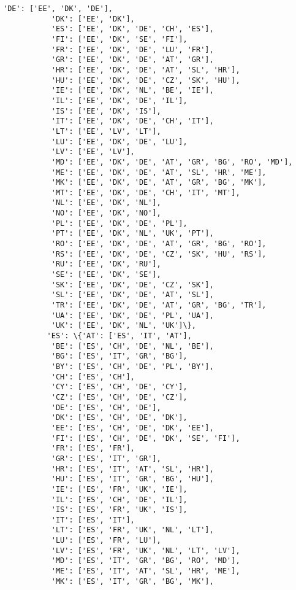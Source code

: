 \documentclass[11pt]{article}
\begin{document}
\begin{Verbatim}[commandchars=\\\{\}]
           'DE': ['EE', 'DK', 'DE'],
           'DK': ['EE', 'DK'],
           'ES': ['EE', 'DK', 'DE', 'CH', 'ES'],
           'FI': ['EE', 'DK', 'SE', 'FI'],
           'FR': ['EE', 'DK', 'DE', 'LU', 'FR'],
           'GR': ['EE', 'DK', 'DE', 'AT', 'GR'],
           'HR': ['EE', 'DK', 'DE', 'AT', 'SL', 'HR'],
           'HU': ['EE', 'DK', 'DE', 'CZ', 'SK', 'HU'],
           'IE': ['EE', 'DK', 'NL', 'BE', 'IE'],
           'IL': ['EE', 'DK', 'DE', 'IL'],
           'IS': ['EE', 'DK', 'IS'],
           'IT': ['EE', 'DK', 'DE', 'CH', 'IT'],
           'LT': ['EE', 'LV', 'LT'],
           'LU': ['EE', 'DK', 'DE', 'LU'],
           'LV': ['EE', 'LV'],
           'MD': ['EE', 'DK', 'DE', 'AT', 'GR', 'BG', 'RO', 'MD'],
           'ME': ['EE', 'DK', 'DE', 'AT', 'SL', 'HR', 'ME'],
           'MK': ['EE', 'DK', 'DE', 'AT', 'GR', 'BG', 'MK'],
           'MT': ['EE', 'DK', 'DE', 'CH', 'IT', 'MT'],
           'NL': ['EE', 'DK', 'NL'],
           'NO': ['EE', 'DK', 'NO'],
           'PL': ['EE', 'DK', 'DE', 'PL'],
           'PT': ['EE', 'DK', 'NL', 'UK', 'PT'],
           'RO': ['EE', 'DK', 'DE', 'AT', 'GR', 'BG', 'RO'],
           'RS': ['EE', 'DK', 'DE', 'CZ', 'SK', 'HU', 'RS'],
           'RU': ['EE', 'DK', 'RU'],
           'SE': ['EE', 'DK', 'SE'],
           'SK': ['EE', 'DK', 'DE', 'CZ', 'SK'],
           'SL': ['EE', 'DK', 'DE', 'AT', 'SL'],
           'TR': ['EE', 'DK', 'DE', 'AT', 'GR', 'BG', 'TR'],
           'UA': ['EE', 'DK', 'DE', 'PL', 'UA'],
           'UK': ['EE', 'DK', 'NL', 'UK']\},
          'ES': \{'AT': ['ES', 'IT', 'AT'],
           'BE': ['ES', 'CH', 'DE', 'NL', 'BE'],
           'BG': ['ES', 'IT', 'GR', 'BG'],
           'BY': ['ES', 'CH', 'DE', 'PL', 'BY'],
           'CH': ['ES', 'CH'],
           'CY': ['ES', 'CH', 'DE', 'CY'],
           'CZ': ['ES', 'CH', 'DE', 'CZ'],
           'DE': ['ES', 'CH', 'DE'],
           'DK': ['ES', 'CH', 'DE', 'DK'],
           'EE': ['ES', 'CH', 'DE', 'DK', 'EE'],
           'FI': ['ES', 'CH', 'DE', 'DK', 'SE', 'FI'],
           'FR': ['ES', 'FR'],
           'GR': ['ES', 'IT', 'GR'],
           'HR': ['ES', 'IT', 'AT', 'SL', 'HR'],
           'HU': ['ES', 'IT', 'GR', 'BG', 'HU'],
           'IE': ['ES', 'FR', 'UK', 'IE'],
           'IL': ['ES', 'CH', 'DE', 'IL'],
           'IS': ['ES', 'FR', 'UK', 'IS'],
           'IT': ['ES', 'IT'],
           'LT': ['ES', 'FR', 'UK', 'NL', 'LT'],
           'LU': ['ES', 'FR', 'LU'],
           'LV': ['ES', 'FR', 'UK', 'NL', 'LT', 'LV'],
           'MD': ['ES', 'IT', 'GR', 'BG', 'RO', 'MD'],
           'ME': ['ES', 'IT', 'AT', 'SL', 'HR', 'ME'],
           'MK': ['ES', 'IT', 'GR', 'BG', 'MK'],

\end{Verbatim}
\end{document}
